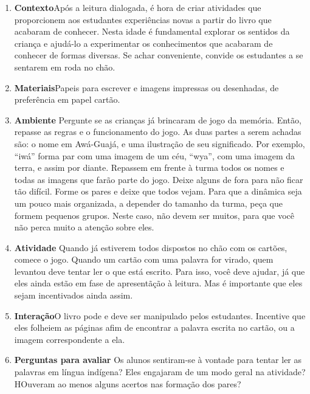 \documentclass[11pt]{extarticle}
\begin{document}
\begin{enumerate}
\item \textbf{Contexto}\quad Após a leitura dialogada, é hora de criar 
atividades que proporcionem aos estudantes experiências novas a partir do livro
que acabaram de conhecer. Nesta idade é fundamental explorar os sentidos da criança e 
ajudá-lo a experimentar os conhecimentos que acabaram de conhecer de formas diversas. Se achar 
conveniente, convide os estudantes a se sentarem em roda no chão.

\item \textbf{Materiais}\quad Papeis para escrever e imagens impressas ou desenhadas, de preferência
em papel cartão.

\item \textbf{Ambiente}\quad 
Pergunte se as crianças já brincaram de jogo da memória. Então, repasse as regras e o funcionamento
do jogo. As duas partes a serem achadas são: o nome em Awá-Guajá, e uma ilustração de 
seu significado. Por exemplo, ``iwá'' forma par com uma imagem de um céu, ``wya'', com uma imagem da terra,
e assim por diante. Repassem em frente à turma todos os nomes e todas as imagens que farão parte do jogo.
Deixe alguns de fora para não ficar tão difícil. Forme os pares e deixe que todos vejam. 
Para que a dinâmica seja um pouco mais organizada, a depender do tamanho da turma, peça
que formem pequenos grupos. Neste caso, não devem ser muitos, para que você não perca muito
a atenção sobre eles. 

\item \textbf{Atividade}\quad 
Quando já estiverem todos dispostos no chão com os cartões, comece o jogo. 
Quando um cartão com uma palavra for virado, quem levantou deve tentar ler o que está escrito.
Para isso, você deve ajudar, já que eles ainda estão em fase de apresentãção à leitura.
Mas é importante que eles sejam incentivados ainda assim. 


\item \textbf{Interação}\quad O livro pode e deve ser 
manipulado pelos estudantes. Incentive que eles folheiem as páginas afim de encontrar a palavra 
escrita no cartão, ou a imagem correspondente a ela. 


\item \textbf{Perguntas para avaliar}\quad
Os alunos sentiram-se à vontade para tentar ler as palavras em língua 
indígena? Eles engajaram de um modo geral na atividade? 
HOuveram ao menos alguns acertos nas formação dos pares? 


\end{enumerate}
\end{document}
